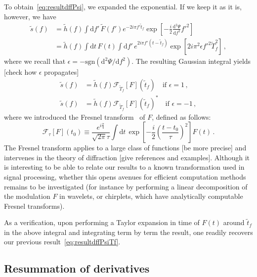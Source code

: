\documentclass[aps,showpacs,%
prd,superscriptaddress,nofootinbib]{revtex4}
\newcommand{\be}{\begin{equation}}
\newcommand{\ee}{\end{equation}}
\newcommand\ud{{\mathrm{d}}}
\newcommand\calF{{\mathcal{F}}}
\newcommand{\tf}{\tilde{t}_{f}}
\newcommand{\Tf}{\tilde{T}_{f}}
\begin{document}
To obtain~\eqref{eq:resultdffPsi}, we expanded the exponential. If we keep it as it is, however, we have
%
\begin{subequations}
\begin{align}
	\tilde{s}(f) &= \tilde{h}(f) \int\ud f'\, \tilde{F}(f') e^{-2i\pi f'\tf} \exp\left[ -\frac{i}{2} \frac{\ud^{2} \Psi}{\ud f^{2}} {f'}^{2} \right] \, \\
	&= \tilde{h}(f) \int \ud t\, F(t) \int\ud f'\, e^{2i\pi f' (t-\tf)} \exp\left[ 2i\pi^{2} \epsilon{f'}^{2} \Tf^{2} \right] \,,
\end{align}
\end{subequations}
%
where we recall that $\epsilon = -\mathrm{sgn}(\ud ^{2} \Psi/\ud f^{2})$. The resulting Gaussian integral yields [check how $\epsilon$ propagates]
%
\begin{subequations}
\begin{align}\label{eq:resultFresnel}
	\tilde{s}(f) &= \tilde{h}(f) \calF_{\Tf}[F](\tf) \quad \text{if } \epsilon = 1 \,,\\
	\tilde{s}(f) &= \tilde{h}(f) \calF_{\Tf}[F](\tf)^{*} \quad \text{if } \epsilon = -1 \,,
\end{align}
\end{subequations}
%
where we introduced the Fresnel transform~\cite{} of $F$, defined as follows:
%
\be\label{eq:defFresnel}
	\calF_{\tau}[F](t_{0}) \equiv \frac{e^{i\frac{\pi}{4}}}{\sqrt{2\pi} \tau} \int \ud t \, \exp\left[ - \frac{i}{2} \left( \frac{t-t_{0}}{\tau} \right)^{2}\right] F(t) \,.
\ee
%
The Fresnel transform applies to a large class of functions [be more precise] and intervenes in the theory of diffraction [give references and examples]. Although it is interesting to be able to relate our results to a known transformation used in signal processing, whether this opens avenues for efficient computation methods remains to be investigated (for instance by performing a linear decomposition of the modulation $F$ in wavelets, or chirplets, which have analytically computable Fresnel transforms). 

As a verification, upon performing a Taylor expansion in time of $F(t)$ around $\tf$ in the above integral and integrating  term by term the result, one readily recovers our previous result~\eqref{eq:resultdffPsiTf}.


\subsection{Resummation of derivatives}
\label{subsec:resummation}
\end{document}
